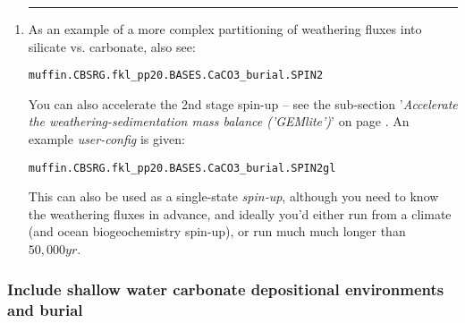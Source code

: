 \begin{enumerate}[noitemsep]
\begin{enumerate}
\end{enumerate}

\item []\noindent\rule{4cm}{0.5pt}
\vspace{1mm}

As an example of a more complex partitioning of weathering fluxes into silicate vs. carbonate, also see:
\vspace{-1mm}\small\begin{verbatim}
muffin.CBSRG.fkl_pp20.BASES.CaCO3_burial.SPIN2
\end{verbatim}\normalsize\vspace{-1mm}

\vspace{1mm}
\noindent You can also accelerate the 2nd stage spin-up -- see the sub-section '\textit{Accelerate the weathering-sedimentation mass balance ('GEMlite')}' on page \pageref{subsec:accelerate_the_weathering-sedimentation_mass_balance}. An example \textit{user-config} is given:
\vspace{-1mm}\small\begin{verbatim}
muffin.CBSRG.fkl_pp20.BASES.CaCO3_burial.SPIN2gl
\end{verbatim}\normalsize\vspace{-1mm}
This can also be used as a single-state \textit{spin-up}, although you need to know the weathering fluxes in advance, and ideally you'd either run from a climate (and ocean biogeochemistry spin-up), or run much much longer than \(50,000 yr\).

\end{enumerate}

%
\newpage
\subsubsection{Include shallow water carbonate depositional environments and burial}\label{subsec:include_shallow_water_depositional_systems}
\vspace{1mm}

